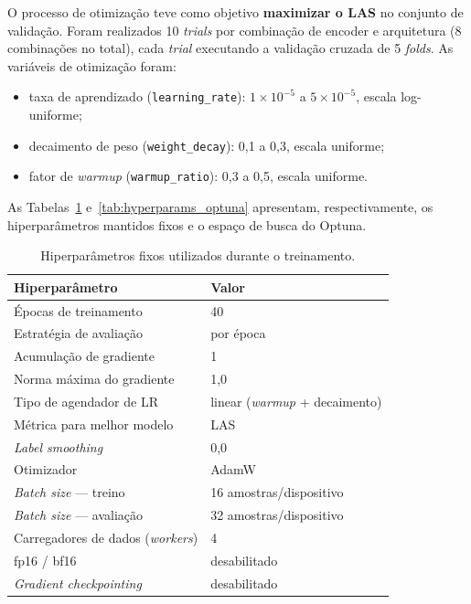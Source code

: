 O processo de otimização teve como objetivo \textbf{maximizar o LAS} no conjunto de validação.
Foram realizados 10 \textit{trials} por combinação de encoder e arquitetura (8 combinações
no total), cada \textit{trial} executando a validação cruzada de 5 \textit{folds}. As
variáveis de otimização foram:

\begin{itemize}
    \item taxa de aprendizado (\texttt{learning\_rate}): $1\times10^{-5}$ a $5\times10^{-5}$, escala log-uniforme;
    \item decaimento de peso (\texttt{weight\_decay}): 0,1 a 0,3, escala uniforme;
    \item fator de \textit{warmup} (\texttt{warmup\_ratio}): 0,3 a 0,5, escala uniforme.
\end{itemize}

As Tabelas~\ref{tab:hyperparams_fixed} e~\ref{tab:hyperparams_optuna} apresentam,
respectivamente, os hiperparâmetros mantidos fixos e o espaço de busca do Optuna.

\begin{table}[h]
\centering
\setlength{\tabcolsep}{12pt}
\caption{Hiperparâmetros fixos utilizados durante o treinamento.}
\label{tab:hyperparams_fixed}
\begin{tabular}{ll}
\toprule
\textbf{Hiperparâmetro}          & \textbf{Valor} \\
\midrule
Épocas de treinamento            & 40 \\
Estratégia de avaliação          & por época \\
Acumulação de gradiente          & 1 \\
Norma máxima do gradiente        & 1,0 \\
Tipo de agendador de LR          & linear (\textit{warmup} + decaimento) \\
Métrica para melhor modelo       & LAS \\
\textit{Label smoothing}         & 0,0 \\
Otimizador                       & AdamW \\
\textit{Batch size} — treino     & 16 amostras/dispositivo \\
\textit{Batch size} — avaliação  & 32 amostras/dispositivo \\
Carregadores de dados (\textit{workers}) & 4 \\
fp16 / bf16                      & desabilitado \\
\textit{Gradient checkpointing}  & desabilitado \\
\bottomrule
\end{tabular}
\end{table}

